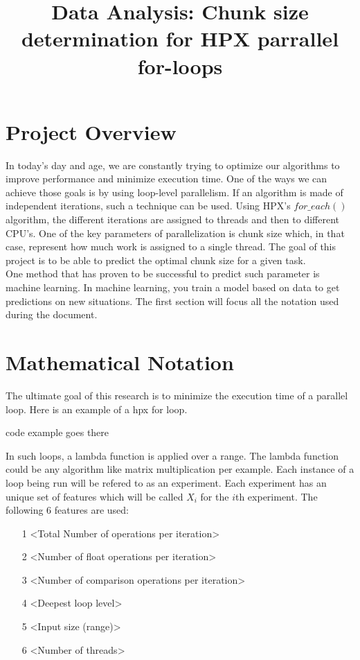 \documentclass[12pt]{article}
\title{Data Analysis: Chunk size determination for HPX parrallel for-loops }
\begin{document}
\newpage
\section*{Project Overview}
 In today's day and age, we are constantly trying to optimize our algorithms to improve performance and minimize execution time. One of the ways we can achieve those goals is by using loop-level parallelism. If an algorithm is made of independent iterations, such a technique can be used. Using HPX's $for\_each()$ algorithm, the different iterations are assigned to threads and then to different CPU's. One of the key parameters of parallelization is chunk size which, in that case, represent how much work is assigned to a single thread.
The goal of this project is to be able to predict the optimal chunk size for a given task. \\

One method that has proven to be successful to predict such parameter is machine learning. In machine learning, you train a model based on data to get predictions on new situations. The first section will focus all the notation used during the document.

\section{Mathematical Notation}
The ultimate goal of this research is to minimize the execution time of a parallel loop. Here is an example of a hpx for loop. 

code example goes there

In such loops, a lambda function is applied over a range. The lambda function could be any algorithm like matrix multiplication per example. Each instance of a loop being run will be refered to as an experiment. Each experiment has an unique set of features which will be called $X_i$ for the $i$th experiment. The following 6 features are used:

\begin{itemize}
	\item[1] <Total Number of operations per iteration>
	\item[2] <Number of float operations per iteration>
	\item[3] <Number of comparison operations per iteration>
	\item[4] <Deepest loop level>
	\item[5] <Input size (range)>
	\item[6] <Number of threads>
\end{itemize}
\end{document}
